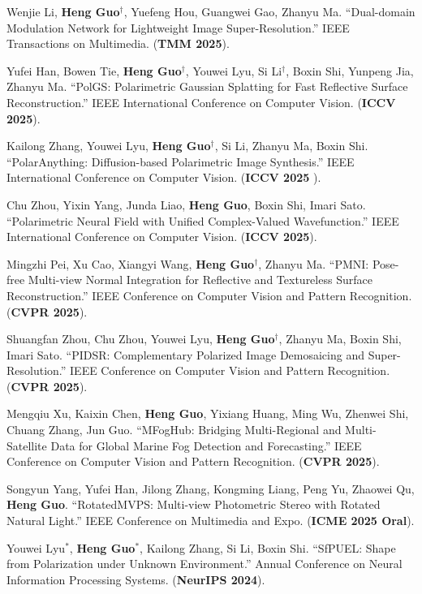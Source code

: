 
\begin{enumerate}[label={[\arabic*]}]
	\item Wenjie Li, \textbf{Heng Guo}$^\dagger$, Yuefeng Hou, Guangwei Gao, Zhanyu Ma. ``Dual-domain Modulation Network for Lightweight Image Super-Resolution.'' IEEE Transactions on Multimedia. (\textbf{TMM 2025}).
	\item Yufei Han, Bowen Tie, \textbf{Heng Guo}$^\dagger$, Youwei Lyu, Si Li$^\dagger$, Boxin Shi, Yunpeng Jia, Zhanyu Ma. ``PolGS: Polarimetric Gaussian Splatting for Fast Reflective Surface Reconstruction.'' IEEE International Conference on Computer Vision. (\textbf{ICCV 2025}).
	\item Kailong Zhang, Youwei Lyu, \textbf{Heng Guo}$^\dagger$, Si Li, Zhanyu Ma, Boxin Shi. ``PolarAnything: Diffusion-based Polarimetric Image Synthesis.'' IEEE International Conference on Computer Vision. (\textbf{ICCV 2025 \color{red}{Highlight}}).
	\item Chu Zhou, Yixin Yang, Junda Liao, \textbf{Heng Guo}, Boxin Shi, Imari Sato. ``Polarimetric Neural Field with Unified Complex-Valued Wavefunction.'' IEEE International Conference on Computer Vision. (\textbf{ICCV 2025}).
	\item Mingzhi Pei, Xu Cao, Xiangyi Wang, \textbf{Heng Guo}$^\dagger$, Zhanyu Ma. ``PMNI: Pose-free Multi-view Normal Integration for Reflective and Textureless Surface Reconstruction.'' IEEE Conference on Computer Vision and Pattern Recognition. (\textbf{CVPR 2025}).
	\item Shuangfan Zhou, Chu Zhou, Youwei Lyu, \textbf{Heng Guo}$^\dagger$, Zhanyu Ma, Boxin Shi, Imari Sato. ``PIDSR: Complementary Polarized Image Demosaicing and Super-Resolution.'' IEEE Conference on Computer Vision and Pattern Recognition. (\textbf{CVPR 2025}).
	\item Mengqiu Xu, Kaixin Chen, \textbf{Heng Guo}, Yixiang Huang, Ming Wu, Zhenwei Shi, Chuang Zhang, Jun Guo. ``MFogHub: Bridging Multi-Regional and Multi-Satellite Data for Global Marine Fog Detection and Forecasting.'' IEEE Conference on Computer Vision and Pattern Recognition. (\textbf{CVPR 2025}).
	\item Songyun Yang, Yufei Han, Jilong Zhang, Kongming Liang, Peng Yu, Zhaowei Qu, \textbf{Heng Guo}. ``RotatedMVPS: Multi-view Photometric Stereo with Rotated Natural Light.'' IEEE Conference on Multimedia and Expo. (\textbf{ICME 2025 \color{red}Oral}).
	\item Youwei Lyu$^*$, \textbf{Heng Guo}$^*$, Kailong Zhang, Si Li, Boxin Shi. ``SfPUEL: Shape from Polarization under Unknown Environment.'' Annual Conference on Neural Information Processing Systems. (\textbf{NeurIPS 2024}).

\end{enumerate}
